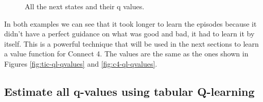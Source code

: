 \documentclass{article}
\newcommand{\GithubURL}[1]{[\href{https://github.com/davidrobles/mlnd-capstone-code/blob/master/#1}{source}]}
\begin{document}

\begin{figure}[!h]
    \centering
     \hspace{0.1in}
    \caption{All the next states and their q values.}
    \label{fig:ql-tab-simple-selfplay-progress}
\end{figure}


In both examples we can see that it took longer to learn the episodes because it didn't have a
perfect guidance on what was good and bad, it had to learn it by itself. This is a powerful
technique that will be used in the next sections to learn a value function for Connect 4. The values
are the same as the ones shown in Figures \hyperref[fig:tic-ql-qvalues]{\ref*{fig:tic-ql-qvalues}}
and \hyperref[fig:c4-ql-qvalues]{\ref*{fig:c4-ql-qvalues}}.

\subsection{Estimate all q-values using tabular Q-learning}

\end{document}
